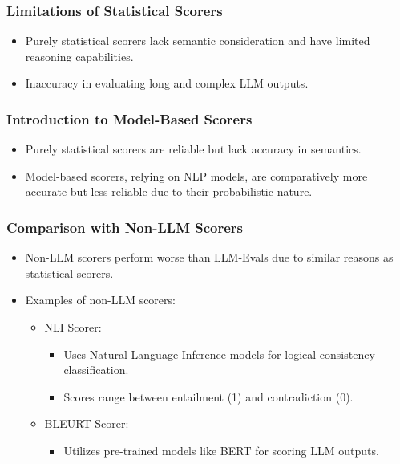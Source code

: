 \begin{frame}[fragile]\frametitle{Limitations of Statistical Scorers}
  \begin{itemize}
    \item Purely statistical scorers lack semantic consideration and have limited reasoning capabilities.
    \item Inaccuracy in evaluating long and complex LLM outputs.
  \end{itemize}
\end{frame}

\begin{frame}[fragile]\frametitle{Introduction to Model-Based Scorers}
  \begin{itemize}
    \item Purely statistical scorers are reliable but lack accuracy in semantics.
    \item Model-based scorers, relying on NLP models, are comparatively more accurate but less reliable due to their probabilistic nature.
  \end{itemize}
\end{frame}

\begin{frame}[fragile]\frametitle{Comparison with Non-LLM Scorers}
  \begin{itemize}
    \item Non-LLM scorers perform worse than LLM-Evals due to similar reasons as statistical scorers.
    \item Examples of non-LLM scorers:
      \begin{itemize}
        \item NLI Scorer:
          \begin{itemize}
            \item Uses Natural Language Inference models for logical consistency classification.
            \item Scores range between entailment (1) and contradiction (0).
          \end{itemize}
        \item BLEURT Scorer:
          \begin{itemize}
            \item Utilizes pre-trained models like BERT for scoring LLM outputs.
          \end{itemize}
      \end{itemize}
  \end{itemize}
\end{frame}

